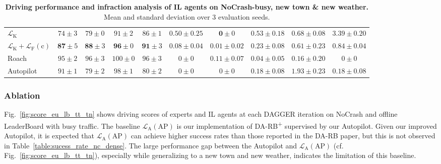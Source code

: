 \begin{table}
\begin{tabular}{lccccccccc}
		$\mathcal{L}_\text{K}$
		& $74\pm3$ & $79\pm0$ & $91\pm2$ & $86\pm1$ 
		& $0.50\pm0.25$ & $\mathbf{0}\pm0$ & $0.53\pm0.18$ & $0.68\pm0.08$ & $3.39\pm0.20$ \\
		$\mathcal{L}_\text{K}+\mathcal{L}_\text{F}(\text{c})$
		& $\mathbf{87} \pm 5$ & $\mathbf{88} \pm 3$ & $\mathbf{96} \pm 0$ & $\mathbf{91} \pm 3$ 
		& $\mathbf{0.08} \pm 0.04$ & $0.01 \pm 0.02$ & $\mathbf{0.23} \pm 0.08$ & $\mathbf{0.61} \pm 0.23$ & $\mathbf{0.84} \pm 0.04$ \\
		\cmidrule(lr){1-1}\cmidrule(lr){2-5}\cmidrule(lr){6-10}
		Roach
		& $95 \pm 2$ & $96 \pm 3$ & $100 \pm 0$ & $96 \pm 3$ 
		& $0 \pm 0$ & $0.11 \pm 0.07$ & $0.04 \pm 0.05$ & $0.16 \pm 0.20$ & $0 \pm 0$ \\
		Autopilot
		& $91 \pm 1$ & $79 \pm 2$ & $98 \pm 1$ & $80 \pm 2$ 
		& $0 \pm 0$ & $0 \pm 0$ & $0.18 \pm 0.08$ & $1.93 \pm 0.23$ & $0.18 \pm 0.08$\\
		\bottomrule
	\end{tabular}
	\vspace{-1ex}
	\caption{\textbf{Driving performance and infraction analysis of IL agents on NoCrash-busy, new town \& new weather.} 
		Mean and standard deviation over 3 evaluation seeds.}
	\vspace{-2.5ex}
	\label{table:infraction}
\end{table}


\subsubsection{Ablation}

Fig.~\ref{fig:score_eu_lb_tt_tn} shows driving scores of experts and IL agents at each DAGGER iteration on NoCrash and offline LeaderBoard with busy traffic.
The baseline $\mathcal{L}_\text{A}(\text{AP})$ is our implementation of DA-RB\textsuperscript{+} supervised by our Autopilot. 
Given our improved Autopilot, it is expected that $\mathcal{L}_\text{A}(\text{AP})$ can achieve higher success rates than those reported in the DA-RB paper, but this is not observed in Table~\ref{table:sucess_rate_nc_dense}.
The large performance gap between the Autopilot and $\mathcal{L}_\text{A}(\text{AP})$ (cf. Fig.~\ref{fig:score_eu_lb_tt_tn}), especially while generalizing to a new town and new weather, indicates the limitation of this baseline.


